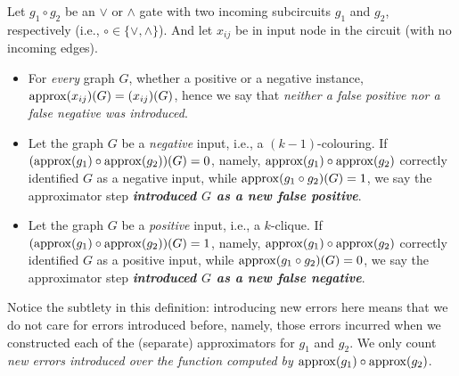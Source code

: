 

\begin{definition}
Let $g_1\circ g_2$ be an $\lor$ or $\land$ gate with two incoming subcircuits $g_1$ and $g_2$, respectively (i.e., $\circ\in\{\lor,\land\}$). And let $x_{ij}$ be in input node in the circuit (with no incoming edges).
\begin{itemize}
\item 
For \emph{every} graph $G$, whether a positive or a  negative instance, 
${\rm approx}(x_{ij})(G)=(x_{ij})(G)$, hence we say that \emph{neither a false positive nor a false negative was introduced}.  
 
\item 
Let the graph $G$ be a \emph{negative} input, i.e., a $(k-1)$-colouring. If $({\rm approx}(g_1)\circ {\rm approx}(g_2))(G)=0$, namely, ${\rm approx}(g_1)\circ {\rm approx}(g_2)$ correctly identified $G$ as a negative input, 
while ${\rm approx}(g_1\circ g_2)(G)=1$, we say the approximator 
step \emph{\textbf{introduced $G$ as a new false positive}}. 

\item Let the graph $G$ be a \emph{positive} input, i.e., a $k$-clique. If $({\rm approx}(g_1) \circ {\rm approx}(g_2))(G)=1$, namely, ${\rm approx}(g_1)\circ {\rm approx}(g_2)$ correctly identified $G$ as a positive input, while 
${\rm approx}(g_1\circ g_2)(G)=0$, we say the approximator 
step \textbf{\emph{introduced $G$ as a new false negative}}.
\end{itemize}
\end{definition}

Notice the  subtlety in this definition: introducing new errors here means that we do not care for errors introduced before, namely, those errors incurred  when we constructed each of the (separate) approximators for $g_1$ and $g_2$. We only count \emph{new errors introduced over the function computed by ${\rm approx}(g_1)\circ {\rm approx}(g_2)$}.







